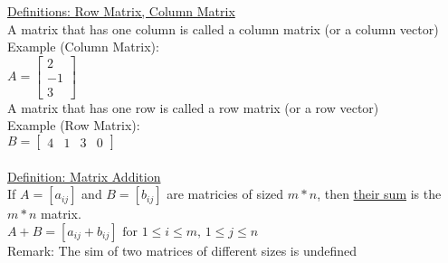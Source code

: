 \documentclass{jhwhw}
\begin{document}
\underline{Definitions: Row Matrix, Column Matrix}\\
A matrix that has one column is called a column matrix (or a column vector)\\

Example (Column Matrix):\\

\(A = \begin{bmatrix} 2 \\ -1 \\ 3\end{bmatrix}\)
\\

A matrix that has one row is called a row matrix (or a row vector)\\

Example (Row Matrix):\\

\(B = \begin{bmatrix}  4 & 1 & 3 & 0 \end{bmatrix}\)
\\ \\

\underline{Definition: Matrix Addition}\\
If \(A = [a_{ij}]\) and \(B = [b_{ij}]\) are matricies of sized \(m*n\), then \underline{their sum} is the \(m*n\) matrix.\\

\(A+B = [a_{ij} + b_{ij}] \text{ for } 1 \leq i \leq m, \, 1 \leq j \leq n\)\\

Remark: The sim of two matrices of different sizes is undefined
\\
\end{document}
